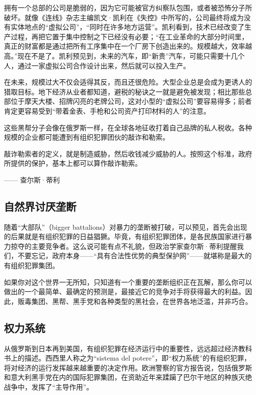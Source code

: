 拥有一个总部的公司是脆弱的，因为它可能被官方纠察队包围，或者被恐怖分子所破坏。就像《连线》杂志主编凯文·凯利在《失控》中所写的，公司最终将成为没有实体地点的“虚拟公司”，“同时在许多地方运营”。凯利看到，技术已经改变了生产过程，再把它置于集中控制之下已经没有必要；“在工业革命的大部分时间里，真正的财富都是通过把所有工序集中在一个厂房下创造出来的。规模越大，效率越高。”现在不是了。凯利预见到，未来的汽车，即“新贵”汽车，可能只需要十几个人，通过一家虚拟公司合作设计出来，然后就可以投入生产。

在未来，规模过大不仅会适得其反，而且还很危险。大型企业总是会成为更诱人的猎取目标。地下经济从业者都知道，避税的秘诀之一就是避免被发现；相比那些总部位于摩天大楼、招牌闪亮的老牌公司，这对小型的“虚拟公司”要容易得多；前者肯定更容易受到“带着金表、手枪和公司资产打印材料的人”的注意。

这些黑帮分子会像在俄罗斯一样，在全球各地征收打着自己品牌的私人税收。各种规模的企业都可能遭到有组织犯罪团伙的敲诈和勒索。

\begin{tcolorbox}
\kaishu 敲诈勒索者的定义，就是制造威胁，然后收钱减少威胁的人。按照这个标准，政府所提供的保护，基本上都可以算作敲诈勒索。
\begin{flushright}
—— 查尔斯·蒂利
\end{flushright}
\end{tcolorbox}

\subsection{自然界讨厌垄断}
随着“大部队”（bigger battalions）对暴力的垄断被打破，可以预见，首先会出现的后果就是有组织犯罪的日益猖獗。毕竟，有组织犯罪团体，是各民族国家进行暴力掠夺的主要竞争者。这么说可能有点不礼貌，但政治学家查尔斯·蒂利提醒我们，不要忘记，政府本身——“具有合法性优势的典型保护网”——就堪称是最大的有组织犯罪集团。

如果你对这个世界一无所知，只知道有一个重要的垄断组织正在瓦解，那么你可以做出的一个最简单、最确定的预测是，最接近它的竞争对手将获得最大的利益。因此，贩毒集团、黑帮、黑手党和各种类型的黑社会，在世界各地泛滥，并非巧合。

\subsection{权力系统}
从俄罗斯到日本再到美国，有组织犯罪在经济运行中的重要性，远远超过经济教科书上的描述。西西里人称之为“sistema del potere”，即“权力系统”的有组织犯罪，将对经济的运行发挥越来越重要的决定作用。欧洲警察的官方报告说，包括俄罗斯和意大利黑手党在内的国际犯罪集团，在资助近年来蹂躏了巴尔干地区的种族灭绝战争中，发挥了“主导作用”。

